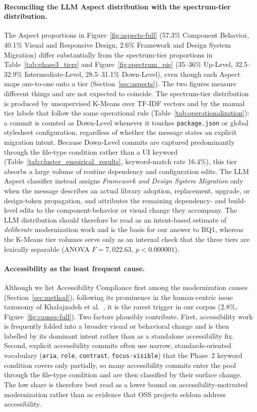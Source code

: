 \documentclass{article}
\begin{document}
\paragraph{Reconciling the LLM Aspect distribution with the spectrum-tier
distribution.}
The Aspect proportions in Figure~\ref{fig:aspects-full} (57.3\% Component
Behavior, 40.1\% Visual and Responsive Design, 2.6\% Framework and Design
System Migration) differ substantially from the spectrum-tier proportions
in Table~\ref{tab:phase3_tiers} and Figure~\ref{fig:spectrum_pie}
(35--36\% Up-Level, 32.5--32.9\% Intermediate-Level, 28.5--31.1\%
Down-Level), even though each Aspect maps one-to-one onto a tier
(Section~\ref{sec:aspects}). The two figures measure different things and
are not expected to coincide. The spectrum-tier distribution is produced by
unsupervised K-Means over TF-IDF vectors and by the manual tier labels that
follow the same operational rule (Table~\ref{tab:operationalization}): a
commit is counted as Down-Level whenever it touches \texttt{package.json} or
global stylesheet configuration, regardless of whether the message states an
explicit migration intent. Because Down-Level commits are captured
predominantly through the file-type condition rather than a UI keyword
(Table~\ref{tab:cluster_empirical_results}, keyword-match rate 16.4\%), this
tier absorbs a large volume of routine dependency and configuration edits.
The LLM Aspect classifier instead assigns \emph{Framework and Design System
Migration} only when the message describes an actual library adoption,
replacement, upgrade, or design-token propagation, and attributes the
remaining dependency- and build-level edits to the component-behavior or
visual change they accompany. The LLM distribution should therefore be read
as an intent-based estimate of \emph{deliberate} modernization work and is
the basis for our answer to RQ1, whereas the K-Means tier volumes serve only
as an internal check that the three tiers are lexically separable (ANOVA
$F = 7{,}022.63$, $p < 0.000001$).

\paragraph{Accessibility as the least frequent cause.}
Although we list Accessibility Compliance first among the modernization
causes (Section~\ref{sec:method}), following its prominence in the
human-centric issue taxonomy of Khalajzadeh et
al.~\cite{khalajzadeh2022how}, it is the rarest trigger in our corpus
(2.8\%, Figure~\ref{fig:causes-full}). Two factors plausibly contribute.
First, accessibility work is frequently folded into a broader visual or
behavioral change and is then labelled by its dominant intent rather than
as a standalone accessibility fix. Second, explicit accessibility commits
often use narrow, standards-oriented vocabulary (\texttt{aria},
\texttt{role}, \texttt{contrast}, \texttt{focus-visible}) that the Phase~2
keyword condition covers only partially, so many accessibility commits
enter the pool through the file-type condition and are then classified by
their surface change. The low share is therefore best read as a lower bound
on accessibility-motivated modernization rather than as evidence that OSS
projects seldom address accessibility.
\end{document}
